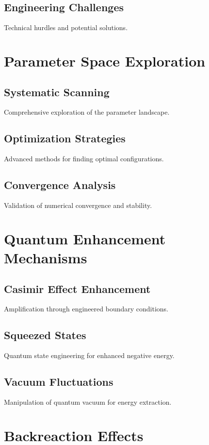 \documentclass{article}
\begin{document}
\subsection{Engineering Challenges}
Technical hurdles and potential solutions.

\section{Parameter Space Exploration}

\subsection{Systematic Scanning}
Comprehensive exploration of the parameter landscape.

\subsection{Optimization Strategies}
Advanced methods for finding optimal configurations.

\subsection{Convergence Analysis}
Validation of numerical convergence and stability.

\section{Quantum Enhancement Mechanisms}

\subsection{Casimir Effect Enhancement}
Amplification through engineered boundary conditions.

\subsection{Squeezed States}
Quantum state engineering for enhanced negative energy.

\subsection{Vacuum Fluctuations}
Manipulation of quantum vacuum for energy extraction.

\section{Backreaction Effects}
\end{document}
